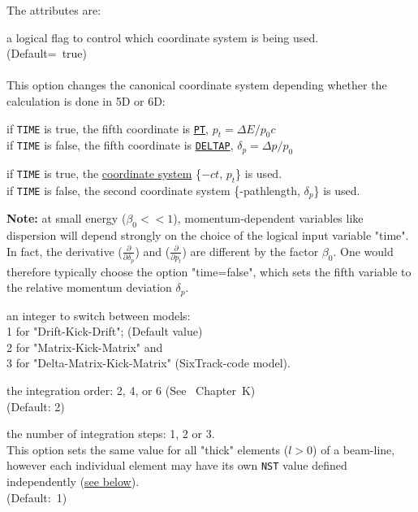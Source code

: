 The attributes are:
\begin{madlist}

   a logical flag to control which coordinate system 
  is being used. \\ (Default=~true) \\ \\
  This option changes the canonical coordinate system depending
  whether the calculation is done in 5D or 6D: 
  \begin{madlist}
     if {\tt TIME} is true, the fifth coordinate is
    \hyperref[sec:canon]{\tt PT}, $p_t = \Delta E / p_0 c$ \\ 
    if {\tt TIME} is false, the fifth coordinate is
    \hyperref[sec:canon]{\tt DELTAP}, $\delta_p = \Delta p / p_0$
    
     if {\tt TIME} is true, the \hyperref[sec:canon]{\madx
      coordinate system} \{$-ct$, $p_t$\} is used. \\   
    if {\tt TIME} is false, the second \ptc coordinate system
    \{-pathlength, $\delta_p$\} is used. 
  \end{madlist}
  
 {\bf Note:} at small energy ($\beta_0 << 1$),
 momentum-dependent variables like dispersion will depend  strongly on
 the choice of  the logical input variable "time".  In fact, the
 derivative ($\frac{\partial}{\partial \delta_p}$)  and
 ($\frac{\partial}{\partial p_t}$)  are different by the
 factor $\beta_0$. One would  therefore typically  choose
 the option "time=false",  which sets the fifth variable to
 the relative momentum deviation $\delta_p$.

   
   an integer to switch between models:\\
  1 for "Drift-Kick-Drift";  (Default value)\\ 
  2 for "Matrix-Kick-Matrix" and \\ 
  3 for "Delta-Matrix-Kick-Matrix" (SixTrack-code model).
     
   the integration order: 2, 4, or 6 (See
  \cite{forest2002}~Chapter~K) \\ (Default: 2)
  
   the number of integration steps: 1, 2 or 3. \\
  This option sets the same value  for all "thick" elements
  ($l > 0$) of a beam-line, however each individual element may have
  its own {\tt NST} value defined independently
  (\hyperref[sec:add_option_PTC]{see below}). \\ 
  (Default:~1)


\end{madlist}
